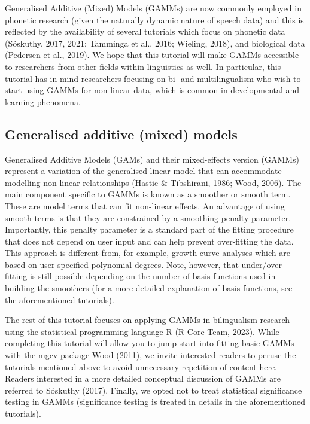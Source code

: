 \documentclass[
  letterpaper,
  DIV=11,
  numbers=noendperiod]{scrartcl}
\begin{document}
Generalised Additive (Mixed) Models (GAMMs) are now commonly employed in
phonetic research (given the naturally dynamic nature of speech data)
and this is reflected by the availability of several tutorials which
focus on phonetic data (Sóskuthy, 2017, 2021; Tamminga et al., 2016;
Wieling, 2018), and biological data (Pedersen et al., 2019). We hope
that this tutorial will make GAMMs accessible to researchers from other
fields within linguistics as well. In particular, this tutorial has in
mind researchers focusing on bi- and multilingualism who wish to start
using GAMMs for non-linear data, which is common in developmental and
learning phenomena.

\subsection{Generalised additive (mixed)
models}\label{generalised-additive-mixed-models}

Generalised Additive Models (GAMs) and their mixed-effects version
(GAMMs) represent a variation of the generalised linear model that can
accommodate modelling non-linear relationships (Hastie \& Tibshirani,
1986; Wood, 2006). The main component specific to GAMMs is known as a
smoother or smooth term. These are model terms that can fit non-linear
effects. An advantage of using smooth terms is that they are constrained
by a smoothing penalty parameter. Importantly, this penalty parameter is
a standard part of the fitting procedure that does not depend on user
input and can help prevent over-fitting the data. This approach is
different from, for example, growth curve analyses which are based on
user-specified polynomial degrees. Note, however, that
under/over-fitting is still possible depending on the number of basis
functions used in building the smoothers (for a more detailed
explanation of basis functions, see the aforementioned tutorials).

The rest of this tutorial focuses on applying GAMMs in bilingualism
research using the statistical programming language R (R Core Team,
2023). While completing this tutorial will allow you to jump-start into
fitting basic GAMMs with the mgcv package Wood (2011), we invite
interested readers to peruse the tutorials mentioned above to avoid
unnecessary repetition of content here. Readers interested in a more
detailed conceptual discussion of GAMMs are referred to Sóskuthy (2017).
Finally, we opted not to treat statistical significance testing in GAMMs
(significance testing is treated in details in the aforementioned
tutorials).
\end{document}
